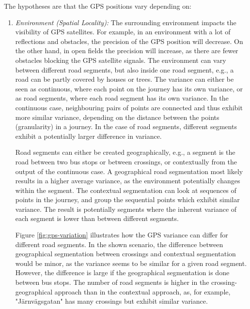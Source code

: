 The hypotheses are that the GPS positions vary depending on:
\begin{enumerate}
    \item \textit{Environment (Spatial Locality):} 
    The surrounding environment impacts the visibility of GPS satellites.
    For example, in an environment with a lot of reflections and obstacles, the precision of the GPS position will decrease.
    On the other hand, in open fields the precision will increase, as there are fewer obstacles blocking the GPS satellite signals.
    The environment can vary between different road segments, but also inside one road segment, e.g., a road can be partly covered by houses or trees.
    The variance can either be seen as continuous, where each point on the journey has its own variance, or as road segments, where each road segment has its own variance.
    In the continuous case, neighbouring pairs of points are connected and thus exhibit more similar variance, depending on the distance between the points (granularity) in a journey.
    In the case of road segments, different segments exhibit a potentially larger difference in variance.
    
    Road segments can either be created geographically, e.g., a segment is the road between two bus stops or between crossings, or contextually from the output of the continuous case.
    A geographical road segmentation most likely results in a higher average variance, as the environment potentially changes within the segment.
    The contextual segmentation can look at sequences of points in the journey, and group the sequential points which exhibit similar variance.
    The result is potentially segments where the inherent variance of each segment is lower than between different segments.

    Figure \ref{fig:gps-variation} illustrates how the GPS variance can differ for different road segments.
    In the shown scenario, the difference between geographical segmentation between crossings and contextual segmentation would be minor, as the variance seems to be similar for a given road segment.
    However, the difference is large if the geographical segmentation is done between bus stops.
    The number of road segments is higher in the crossing-geographical approach than in the contextual approach, as, for example, "Järnvägsgatan" has many crossings but exhibit similar variance. 
    

\end{enumerate}
